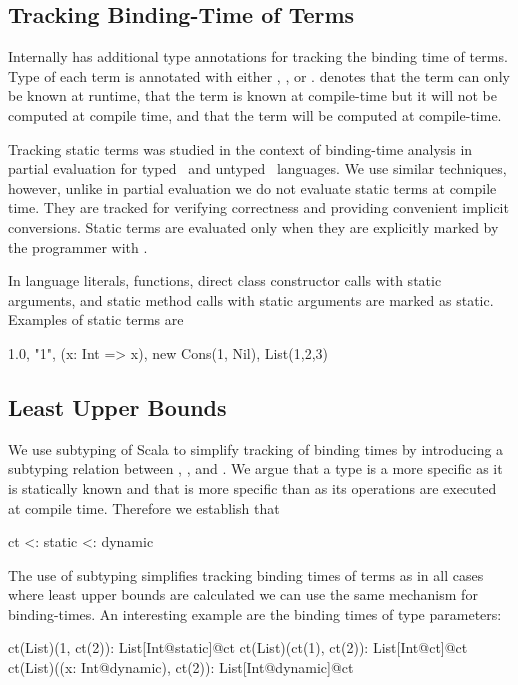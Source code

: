 \subsection{Tracking Binding-Time of Terms}
\label{sct:static}

 Internally \tool has additional type annotations for tracking the binding time of terms.
  Type of each term is annotated with either , , or .  denotes
  that the term can only be known at runtime,  that the term is known
  at compile-time but it will not be computed at compile time, and  that
  the term will be computed at compile-time.

 Tracking static terms was studied in the context of binding-time analysis
  in partial evaluation for typed~\cite{nielson_1988_automatic} and
  untyped~\cite{gomard1991partial} languages. We use similar techniques, however,
  unlike in partial evaluation we do not evaluate static terms at compile time. They are tracked for verifying
  correctness and providing convenient implicit conversions. Static terms are evaluated only
  when they are explicitly marked by the programmer with .

In \tool language literals, functions, direct class constructor calls with static arguments, and static method
 calls with static arguments are marked as static. Examples of static terms are\begin{lstparagraph}
1.0, "1", (x: Int => x), new Cons(1, Nil), List(1,2,3)
\end{lstparagraph}

\subsection{Least Upper Bounds}
\label{sct:lub}

 We use subtyping of Scala to simplify tracking of binding times by introducing a
 subtyping relation between , , and . We argue that
 a  type is a more specific  as it is statically known
 and that  is more specific than  as its operations are executed
 at compile time. Therefore we establish that\begin{lstparagraph}
                 ct <: static <: dynamic
\end{lstparagraph}

 The use of subtyping simplifies tracking binding times of terms as in all cases
 where least upper bounds are calculated we can use the same mechanism for binding-times.
 An interesting example are the binding times of type parameters:\begin{lstparagraph}
ct(List)(1, ct(2)): List[Int@static]@ct
ct(List)(ct(1), ct(2)): List[Int@ct]@ct
ct(List)((x: Int@dynamic), ct(2)): List[Int@dynamic]@ct
\end{lstparagraph}

